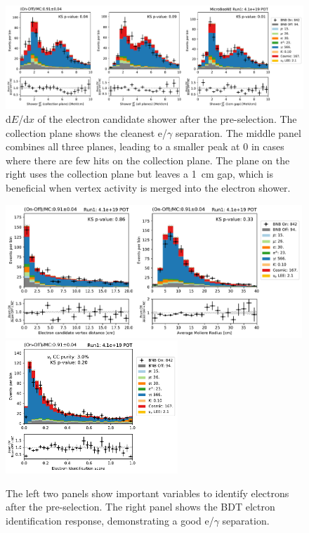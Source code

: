 \begin{figure}[h]
    \centering
    \includegraphics[width=\textwidth]{NueCCsel/Images/run1/e_cand_dedx.pdf}
    \caption{d$E$/d$x$ of the electron candidate shower after the pre-selection. The collection plane shows the cleanest e/$\gamma$ separation. The middle panel combines all three planes, leading to a smaller peak at 0 in cases where there are few hits on the collection plane. The plane on the right uses the collection plane but leaves a \SI{1}{\cm} gap, which is beneficial when vertex activity is merged into the electron shower.}
    \label{fig:e_cand_dedx}
\end{figure}

\begin{figure}[h]
    \centering
    \includegraphics[height=5cm]{NueCCsel/Images/run1/e_cand_dist.pdf}
    \includegraphics[height=5cm]{NueCCsel/Images/run1/pre_e_score.pdf}
    \caption{The left two panels show important variables to identify electrons after the pre-selection. The right panel shows the BDT elctron identification response, demonstrating a good e/$\gamma$ separation.}
    \label{fig:e_cand_dist}
\end{figure}


